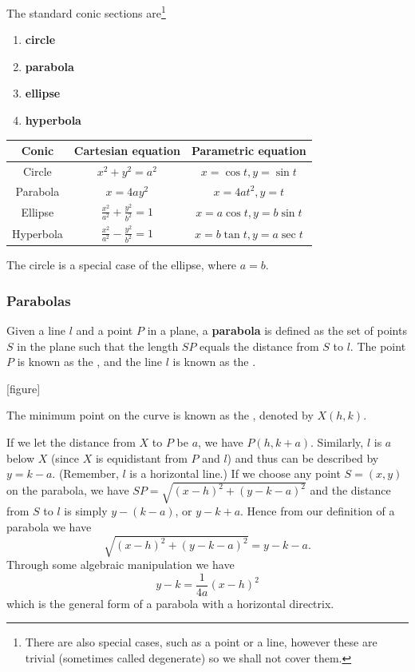 The standard conic sections are\footnote{There are also special cases, such as a point or a line, however these are trivial (sometimes called degenerate) so we shall not cover them.}
\begin{enumerate}
\item \textbf{circle}
\item \textbf{parabola}
\item \textbf{ellipse}
\item \textbf{hyperbola}
\end{enumerate}

\begin{table}[H]
\centering
\renewcommand{\arraystretch}{1.8}
\begin{tabular}{c|c|c}
\hline\hline
Conic & Cartesian equation & Parametric equation \\
\hline
Circle & $x^2+y^2=a^2$ & $x=\cos t, y=\sin t$ \\
Parabola & $x=4ay^2$ & $x=4at^2, y=t$ \\
Ellipse & $\frac{x^2}{a^2}+\frac{y^2}{b^2}=1$ & $x=a\cos t, y=b\sin t$ \\
Hyperbola & $\frac{x^2}{a^2}-\frac{y^2}{b^2}=1$ & $x=b\tan t, y=a\sec t$ \\
\hline\hline
\end{tabular}
\end{table}

\begin{remark}
The circle is a special case of the ellipse, where $a=b$.
\end{remark}

\subsubsection{Parabolas}
Given a line $l$ and a point $P$ in a plane, a \textbf{parabola} is defined as the set of points $S$ in the plane such that the length $SP$ equals the distance from $S$ to $l$. The point $P$ is known as the , and the line $l$ is known as the .

[figure]

The minimum point on the curve is known as the , denoted by $X(h,k)$.

If we let the distance from $X$ to $P$ be $a$, we have $P(h,k+a)$. Similarly, $l$ is $a$ below $X$ (since $X$ is equidistant from $P$ and $l$) and thus can be described by $y=k-a$. (Remember, $l$ is a horizontal line.) If we choose any point $S=(x,y)$ on the parabola, we have $SP=\sqrt{(x-h)^2+(y-k-a)^2}$ and the distance from $S$ to $l$ is simply $y-(k-a)$, or $y-k+a$. Hence from our definition of a parabola we have 
\[ \sqrt{(x-h)^2+(y-k-a)^2}=y-k-a. \]
Through some algebraic manipulation we have 
\begin{equation}
y-k=\frac{1}{4a}(x-h)^2
\end{equation}
which is the general form of a parabola with a horizontal directrix.


